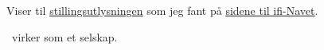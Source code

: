Viser til \href{\urlNative}{\underline{\textcolor{linkcolor}{stillingsutlysningen}}} som jeg fant på
\href{\urlNavet}{\underline{\textcolor{linkcolor}{sidene til ifi-Navet}}}.

\company ~virker som et selskap. \blindtext

\blindtext
